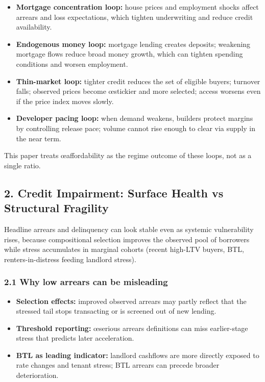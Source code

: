 \documentclass[
]{article}
\providecommand{\tightlist}{%
  \setlength{\itemsep}{0pt}\setlength{\parskip}{0pt}}
\begin{document}
\begin{itemize}
\tightlist
\item
  \textbf{Mortgage concentration loop:} house prices and employment
  shocks affect arrears and loss expectations, which tighten
  underwriting and reduce credit availability.
\item
  \textbf{Endogenous money loop:} mortgage lending creates deposits;
  weakening mortgage flows reduce broad money growth, which can tighten
  spending conditions and worsen employment.
\item
  \textbf{Thin-market loop:} tighter credit reduces the set of eligible
  buyers; turnover falls; observed prices become œstickier and more
  selected; access worsens even if the price index moves slowly.
\item
  \textbf{Developer pacing loop:} when demand weakens, builders protect
  margins by controlling release pace; volume cannot rise enough to
  clear via supply in the near term.
\end{itemize}

This paper treats œaffordability as the regime outcome of these loops,
not as a single ratio.

\subsection{2. Credit Impairment: Surface Health vs Structural
Fragility}\label{credit-impairment-surface-health-vs-structural-fragility}

Headline arrears and delinquency can look stable even as systemic
vulnerability rises, because compositional selection improves the
observed pool of borrowers while stress accumulates in marginal cohorts
(recent high-LTV buyers, BTL, renters-in-distress feeding landlord
stress).

\subsubsection{2.1 Why low arrears can be
misleading}\label{why-low-arrears-can-be-misleading}

\begin{itemize}
\tightlist
\item
  \textbf{Selection effects:} improved observed arrears may partly
  reflect that the stressed tail stops transacting or is screened out of
  new lending.
\item
  \textbf{Threshold reporting:} œserious arrears definitions can miss
  earlier-stage stress that predicts later acceleration.
\item
  \textbf{BTL as leading indicator:} landlord cashflows are more
  directly exposed to rate changes and tenant stress; BTL arrears can
  precede broader deterioration.
\end{itemize}
\end{document}
